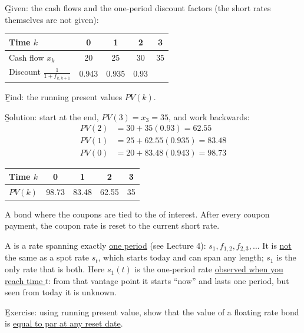 \begin{example}
    \b{Given}: the cash flows and the one-period discount factors (the short rates themselves are not given):
    \begin{center}
    \begin{tabular}{lcccc}
        \toprule
        Time $k$ & 0 & 1 & 2 & 3\\
        \midrule
        Cash flow $x_k$ & 20 & 25 & 30 & 35\\
        Discount $\frac{1}{1+f_{k,k+1}}$ & 0.943 & 0.935 & 0.93 & \\
        \bottomrule
    \end{tabular}
    \end{center}
    \b{Find}: the running present values $PV(k)$.

    \b{Solution}: start at the end, $PV(3) = x_3 = 35$, and work backwards:
    \begin{align*}
        PV(2) &= 30 + 35(0.93) = 62.55\\
        PV(1) &= 25 + 62.55(0.935) = 83.48\\
        PV(0) &= 20 + 83.48(0.943) = \boxed{98.73}
    \end{align*}
    \begin{center}
    \begin{tabular}{lcccc}
        \toprule
        Time $k$ & 0 & 1 & 2 & 3\\
        \midrule
        $PV(k)$ & 98.73 & 83.48 & 62.55 & 35\\
        \bottomrule
    \end{tabular}
    \end{center}
\end{example}

\begin{definition}
    A bond where the coupons are tied to the  of interest. After every coupon payment, the coupon rate is reset to the current short rate.
\end{definition}
\begin{remark}
    A  is a rate spanning exactly \ul{one period} (see Lecture 4): $s_1, f_{1,2}, f_{2,3}, \dots$ It is \ul{not} the same as a spot rate $s_t$, which starts today and can span any length; $s_1$ is the only rate that is both. Here $s_1(t)$ is the one-period rate \ul{observed when you reach time $t$}: from that vantage point it starts ``now'' and lasts one period, but seen from today it is unknown.
\end{remark}
\b{Exercise}: using running present value, show that the value of a floating rate bond is \ul{equal to par at any reset date}.


